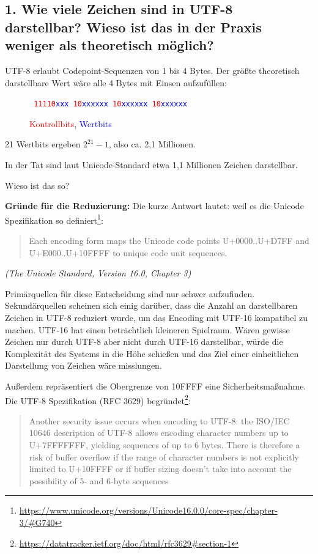 \documentclass{article}
\begin{document}
\subsection*{1. Wie viele Zeichen sind in UTF-8 darstellbar? Wieso ist das in der Praxis weniger als theoretisch möglich?}

UTF-8 erlaubt Codepoint-Sequenzen von 1 bis 4 Bytes.
Der größte theoretisch darstellbare Wert wäre alle 4 Bytes mit Einsen aufzufüllen:

\begin{figure}[h]
\centering
\texttt{%
\textcolor{red}{11110}\textcolor{blue}{xxx} 
\textcolor{red}{10}\textcolor{blue}{xxxxxx} 
\textcolor{red}{10}\textcolor{blue}{xxxxxx} 
\textcolor{red}{10}\textcolor{blue}{xxxxxx}
}
\caption{\textcolor{red}{Kontrollbits}, \textcolor{blue}{Wertbits}}
\end{figure}

21 Wertbits ergeben $2^{21} - 1$, also ca. 2,1 Millionen.

In der Tat sind laut Unicode-Standard etwa 1,1 Millionen Zeichen darstellbar.

Wieso ist das so? 
 
\textbf{Gründe für die Reduzierung:}
Die kurze Antwort lautet: weil es die Unicode Spezifikation so definiert\footnote{\url{https://www.unicode.org/versions/Unicode16.0.0/core-spec/chapter-3/#G740}}: 

\begin{quote}
Each encoding form maps the Unicode code points U+0000..U+D7FF and U+E000..U+10FFFF to unique code unit sequences. 
\end{quote}
\textit{(The Unicode Standard, Version 16.0, Chapter 3)}

Primärquellen für diese Entscheidung sind nur schwer aufzufinden. Sekundärquellen scheinen sich einig darüber, dass die Anzahl an darstellbaren Zeichen in UTF-8 reduziert wurde, um das Encoding mit UTF-16 kompatibel zu machen. UTF-16 hat einen beträchtlich kleineren Spielraum. Wären gewisse Zeichen nur durch UTF-8 aber nicht durch UTF-16 darstellbar, würde die Komplexität des Systems in die Höhe schießen und das Ziel einer einheitlichen Darstellung von Zeichen wäre misslungen.

Außerdem repräsentiert die Obergrenze von 10FFFF eine Sicherheitsmaßnahme. Die UTF-8 Spezifikation (RFC 3629) begründet\footnote{\url{https://datatracker.ietf.org/doc/html/rfc3629#section-1}}:

\begin{quote}
 Another security issue occurs when encoding to UTF-8: the ISO/IEC
   10646 description of UTF-8 allows encoding character numbers up to
   U+7FFFFFFF, yielding sequences of up to 6 bytes.  There is therefore
   a risk of buffer overflow if the range of character numbers is not
   explicitly limited to U+10FFFF or if buffer sizing doesn't take into
   account the possibility of 5- and 6-byte sequences
\end{quote}
\end{document}
